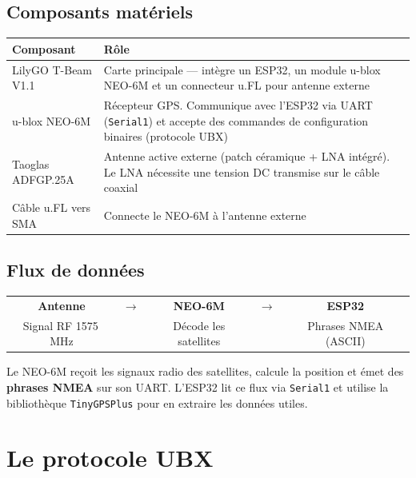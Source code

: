 \documentclass[12pt,a4paper]{article}
\newcommand{\code}[1]{\texttt{#1}}
\begin{document}
\subsection{Composants mat\'eriels}

\begin{infobox}[title=Mat\'eriel impliqu\'e]
\begin{tabular}{L{4.2cm} L{9.5cm}}
\toprule
\textbf{Composant} & \textbf{R\^ole} \\
\midrule
LilyGO T-Beam V1.1
  & Carte principale --- int\`egre un ESP32, un module u-blox NEO-6M
    et un connecteur u.FL pour antenne externe \\[0.4em]
u-blox NEO-6M
  & R\'ecepteur GPS. Communique avec l'ESP32 via UART (\code{Serial1})
    et accepte des commandes de configuration binaires (protocole UBX) \\[0.4em]
Taoglas ADFGP.25A
  & Antenne active externe (patch c\'eramique + LNA int\'egr\'e).
    Le LNA n\'ecessite une tension DC transmise sur le c\^able coaxial \\[0.4em]
C\^able u.FL vers SMA
  & Connecte le NEO-6M \`a l'antenne externe \\
\bottomrule
\end{tabular}
\end{infobox}

\subsection{Flux de donn\'ees}

\begin{center}
\begin{tabular}{ccccc}
\textbf{Antenne} & $\longrightarrow$ & \textbf{NEO-6M} & $\longrightarrow$ & \textbf{ESP32} \\
Signal RF 1575\,MHz & & D\'ecode les satellites & & Phrases NMEA (ASCII) \\
\end{tabular}
\end{center}

\medskip
Le NEO-6M re\c{c}oit les signaux radio des satellites, calcule la position
et \'emet des \textbf{phrases NMEA} sur son UART. L'ESP32 lit ce flux via
\code{Serial1} et utilise la biblioth\`eque \code{TinyGPSPlus} pour en
extraire les donn\'ees utiles.

\section{Le protocole UBX}
\end{document}
